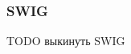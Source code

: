 \documentclass[14pt]{matmex-diploma-custom}
\begin{document}



\subsubsection{SWIG}
TODO выкинуть SWIG




\end{document}
